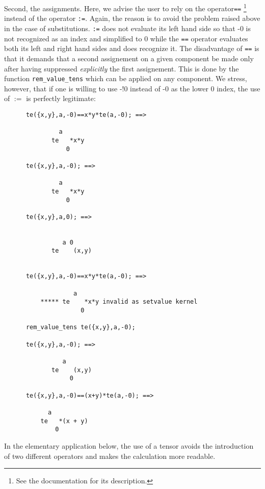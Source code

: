 Second, the assignments. Here, we advise the user to rely on  the
operator\texttt{==}%
%
\footnote{See the  documentation for its description.}
instead of the operator \texttt{:=}. Again,
the reason is to avoid the problem raised above  in the case of
substitutions. \texttt{:=} does not evaluate its left hand side so that -0 is
not recognized as an index and simplified to 0 while the \texttt{==} operator
evaluates both
its left and right hand sides and does recognize it.
The disadvantage of \texttt{==} is that it  demands that a second assignement
on a given component
 be made only after having suppressed \emph{explicitly} the first assignement.
This is done by the function \texttt{rem\_value\_tens}
which can be applied on any component. We stress, however, that if one
is willing to use -!0 instead of -0 as the lower 0 index, the use of $:=$
is perfectly legitimate:
\begin{verbatim}
      te({x,y},a,-0)==x*y*te(a,-0); ==>

               a
             te   *x*y
                 0

      te({x,y},a,-0); ==>

               a
             te   *x*y
                 0

      te({x,y},a,0); ==>


                a 0
             te    (x,y)


      te({x,y},a,-0)==x*y*te(a,-0); ==>

                   a
          ***** te    *x*y invalid as setvalue kernel
                     0

      rem_value_tens te({x,y},a,-0);

      te({x,y},a,-0); ==>

                a
             te    (x,y)
                  0

      te({x,y},a,-0)==(x+y)*te(a,-0); ==>

            a
          te   *(x + y)
              0
\end{verbatim}
In the elementary application below, the use of a tensor avoids the
introduction of two different operators and  makes the
calculation  more readable.
